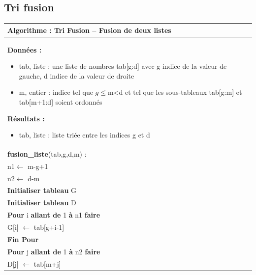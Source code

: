 \documentclass[10pt]{article}
\begin{document}
\subsection{Tri fusion}


\begin{pseudo}
\begin{center}
\begin{tabular}{p{}}
\hline
\textbf{Algorithme :} Tri Fusion -- Fusion de deux listes\\
\hline
\textbf{Données :}
\begin{itemize}
\item \textsf{tab}, liste : une liste de nombres \textsf{tab[g:d]} avec \textsf{g} indice de la valeur de gauche, \textsf{d} indice de la valeur de droite
\item \textsf{m}, entier : indice tel que \textsf{$g\leq$m<d} et tel que les sous-tableaux \textsf{tab[g:m]} et \textsf{tab[m+1:d]} soient ordonnés
\end{itemize}
\textbf{Résultats :} 
\begin{itemize}
\item \textsf{tab}, liste : liste triée entre les indices \textsf{g} et \textsf{d}
\end{itemize}
\\
\textbf{fusion\_liste}(\textsf{tab,g,d,m}) :\\
\hspace{.4cm} \textsf{n1$\leftarrow$ m-g+1}\\
\hspace{.4cm} \textsf{n2$\leftarrow$ d-m}\\
\hspace{.4cm} \textbf{Initialiser tableau} \textsf{G}  \\
\hspace{.4cm} \textbf{Initialiser tableau} \textsf{D}  \\
\hspace{.4cm} \textbf{Pour} \textsf{i} \textbf{allant de} \textsf{1} \textbf{à} \textsf{n1} \textbf{faire}\\
\hspace{.8cm}  \textsf{G[i] $ \leftarrow$ tab[g+i-1]}\\
\hspace{.4cm}  \textbf{Fin Pour}\\
\hspace{.4cm} \textbf{Pour} \textsf{j} \textbf{allant de} \textsf{1} \textbf{à} \textsf{n2} \textbf{faire}\\
\hspace{.8cm} \textsf{D[j] $ \leftarrow$ tab[m+j]}\\

\end{tabular}
\end{center}
\end{pseudo}
\end{document}
